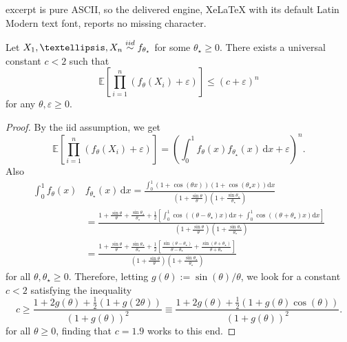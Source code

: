 \documentclass[10pt,a4paper]{amsart}
\def\EE{\mathbb{E}}
\newcommand{\iid}{\overset{\textnormal{iid}}{\sim}}
\begin{document}
excerpt is pure ASCII, so the delivered engine, XeLaTeX with its default Latin Modern text font, reports no missing character.
\begin{lemma}\label{lem:upperbound_prod_likelihood}
    Let $X_1, \dots, X_n\iid f_{\theta_\star}$ for some $\theta_\star\geq 0$. There exists a universal constant $c< 2$ such that
    \begin{equation*}
        \EE\left[\prod_{i=1}^n (f_\theta(X_i)+ \varepsilon)\right] \leq (c+\varepsilon)^n
    \end{equation*}
    for any $\theta, \varepsilon\geq 0$.
\end{lemma}

\begin{proof}
    By the iid assumption, we get
    \begin{equation*}
        \EE\left[\prod_{i=1}^n (f_\theta(X_i)+ \varepsilon)\right] = \left(\int_0^1 f_\theta(x)f_{\theta_\star}(x) \,\mathrm dx + \varepsilon\right)^n.
    \end{equation*}
    Also
    \begin{align*}
        \int_0^1 f_\theta(x)& f_{\theta_\star}(x) \, \mathrm dx = \frac{\int_0^1 (1+\cos(\theta x))(1+\cos(\theta_\star x))\mathrm dx}{\left(1 +\frac{\sin\theta}{\theta}\right)\left( 1 +\frac{\sin\theta_\star}{\theta_\star}\right)} \\
        & = \frac{1 +\frac{\sin\theta}{\theta} + \frac{\sin\theta_\star}{\theta_\star} + \frac{1}{2}\left[\int_0^1 \cos((\theta-\theta_\star) x)\mathrm dx + \int_0^1 \cos((\theta+\theta_\star) x)\mathrm dx\right]}{\left(1 +\frac{\sin\theta}{\theta}\right)\left( 1 +\frac{\sin\theta_\star}{\theta_\star}\right)} \\
        & = \frac{1 +\frac{\sin\theta}{\theta} + \frac{\sin\theta_\star}{\theta_\star} + \frac{1}{2}\left[\frac{\sin(\theta-\theta_\star)}{\theta-\theta_\star} + \frac{\sin(\theta+\theta_\star)}{\theta+\theta_\star}\right]}{\left(1 +\frac{\sin\theta}{\theta}\right)\left( 1 +\frac{\sin\theta_\star}{\theta_\star}\right)}
    \end{align*}
    for all $\theta, \theta_\star\geq 0$. Therefore, letting $g(\theta):=\sin(\theta)/\theta$, we look for a constant $c<2$ satisfying the inequality
    \begin{equation}
        c \geq \frac{1 + 2g(\theta) + \frac{1}{2}(1+g(2\theta))}{(1+g(\theta))^2} \equiv \frac{1 + 2g(\theta) + \frac{1}{2}(1+g(\theta)\cos(\theta))}{(1+g(\theta))^2}.
    \end{equation}
    for all $\theta\geq 0$, finding that $c=1.9$ works to this end.
\end{proof}
\end{document}
